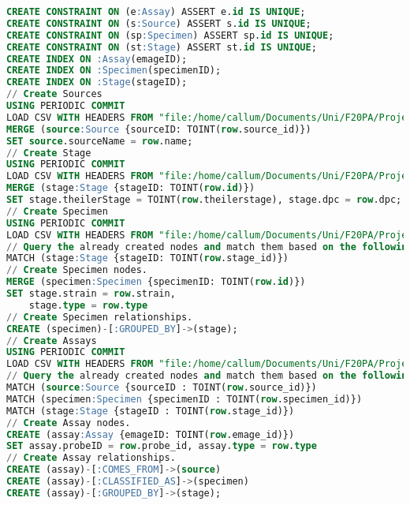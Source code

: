 \begin{lstlisting}[language=SQL, caption=Cypher file created to load the data into the Neo4j data model., label=code:cypher]
CREATE CONSTRAINT ON (e:Assay) ASSERT e.id IS UNIQUE;
CREATE CONSTRAINT ON (s:Source) ASSERT s.id IS UNIQUE;
CREATE CONSTRAINT ON (sp:Specimen) ASSERT sp.id IS UNIQUE;
CREATE CONSTRAINT ON (st:Stage) ASSERT st.id IS UNIQUE;
CREATE INDEX ON :Assay(emageID);
CREATE INDEX ON :Specimen(specimenID);
CREATE INDEX ON :Stage(stageID);
// Create Sources
USING PERIODIC COMMIT
LOAD CSV WITH HEADERS FROM "file:/home/callum/Documents/Uni/F20PA/Project/Neo4j/Data/Sources.csv" AS row
MERGE (source:Source {sourceID: TOINT(row.source_id)})
SET source.sourceName = row.name;
// Create Stage
USING PERIODIC COMMIT
LOAD CSV WITH HEADERS FROM "file:/home/callum/Documents/Uni/F20PA/Project/Neo4j/Data/Stages.csv" AS row
MERGE (stage:Stage {stageID: TOINT(row.id)})
SET stage.theilerStage = TOINT(row.theilerstage), stage.dpc = row.dpc;
// Create Specimen
USING PERIODIC COMMIT
LOAD CSV WITH HEADERS FROM "file:/home/callum/Documents/Uni/F20PA/Project/Neo4j/Data/Specimens.csv" AS row
// Query the already created nodes and match them based on the following clauses.
MATCH (stage:Stage {stageID: TOINT(row.stage_id)}) 
// Create Specimen nodes.
MERGE (specimen:Specimen {specimenID: TOINT(row.id)})
SET stage.strain = row.strain,
	stage.type = row.type
// Create Specimen relationships.
CREATE (specimen)-[:GROUPED_BY]->(stage);
// Create Assays
USING PERIODIC COMMIT
LOAD CSV WITH HEADERS FROM "file:/home/callum/Documents/Uni/F20PA/Project/Neo4j/Data/Assays.csv" AS row
// Query the already created nodes and match them based on the following clauses.
MATCH (source:Source {sourceID : TOINT(row.source_id)})
MATCH (specimen:Specimen {specimenID : TOINT(row.specimen_id)})
MATCH (stage:Stage {stageID : TOINT(row.stage_id)})
// Create Assay nodes.
CREATE (assay:Assay {emageID: TOINT(row.emage_id)})
SET assay.probeID = row.probe_id, assay.type = row.type
// Create Assay relationships.
CREATE (assay)-[:COMES_FROM]->(source)
CREATE (assay)-[:CLASSIFIED_AS]->(specimen)
CREATE (assay)-[:GROUPED_BY]->(stage);
\end{lstlisting}




